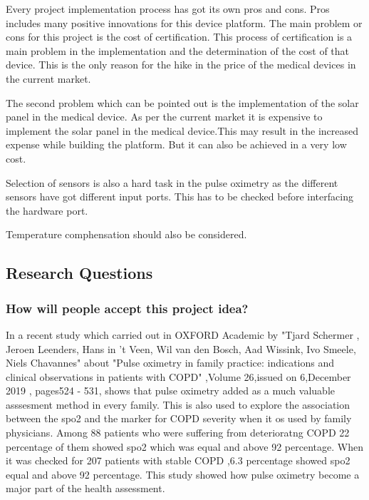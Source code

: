 Every project implementation process has got its own pros and cons. Pros includes many positive innovations for this device platform. The main problem or cons for this project is the cost of certification. This process of certification is a main problem in the implementation and the determination of the cost of that device. This is the only reason for the hike in the price of the medical devices in the current market.

The second problem which can be pointed out is the implementation of the solar panel in the medical device. As per the current market it  is expensive to implement the solar panel in the medical device.This may result in the increased expense while building the platform. But it can also be achieved in a very low cost.

Selection of sensors is also a hard task in the pulse oximetry as the different sensors have got different input ports. This has to be checked before interfacing the hardware port.

Temperature comphensation should also be considered. 


\subsection{Research Questions}



\subsubsection{How will people accept this project idea?}

In a recent study which carried out in OXFORD Academic by "Tjard Schermer , Jeroen Leenders,  Hans in ’t Veen,  Wil van den Bosch,  Aad Wissink, Ivo Smeele,  Niels Chavannes"  about "Pulse oximetry in family practice: indications and clinical observations in patients with COPD" ,Volume 26,issued on 6,December 2019 , pages524 - 531,   shows that  pulse oximetry added as a much valuable asssesment method in every family. This is also used to explore the association between the spo2 and the marker for COPD severity when it os used by family physicians.  Among 88 patients who were suffering from deterioratng COPD 22 percentage of them showed spo2 which was equal and above 92 percentage.  When it was checked for 207 patients with stable COPD ,6.3 percentage showed spo2 equal and above 92 percentage. This study showed how pulse oximetry become a major part of the health assessment.  

